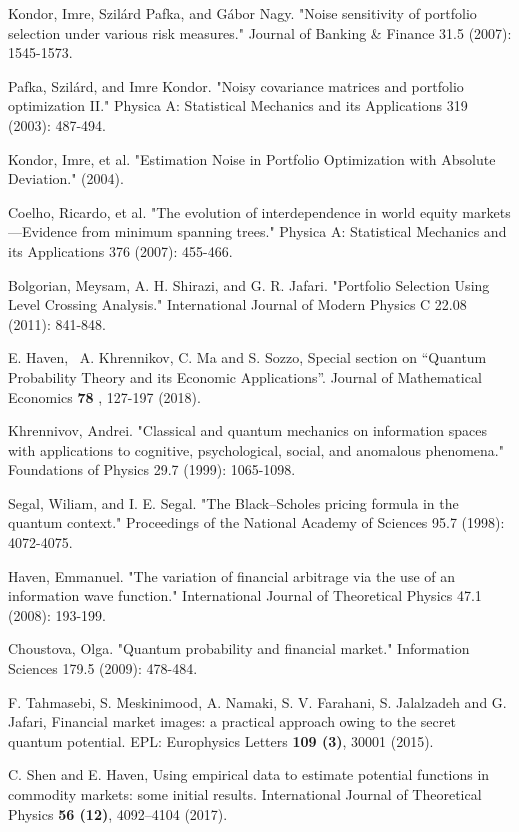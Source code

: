 \documentclass[ aip,jmp,reprint]{revtex4-2}
\begin{document}
\begin{thebibliography}{99}
 Kondor, Imre, Szilárd Pafka, and Gábor Nagy. "Noise sensitivity of portfolio selection under various risk measures." Journal of Banking \& Finance 31.5 (2007): 1545-1573.

  Pafka, Szilárd, and Imre Kondor. "Noisy covariance matrices and portfolio optimization II." Physica A: Statistical Mechanics and its Applications 319 (2003): 487-494.

 Kondor, Imre, et al. "Estimation Noise in Portfolio Optimization with Absolute Deviation." (2004).

 Coelho, Ricardo, et al. "The evolution of interdependence in world equity markets—Evidence from minimum spanning trees." Physica A: Statistical Mechanics and its Applications 376 (2007): 455-466.

 Bolgorian, Meysam, A. H. Shirazi, and G. R. Jafari. "Portfolio Selection Using Level Crossing Analysis." International Journal of Modern Physics C 22.08 (2011): 841-848.


 E. Haven, \ A. Khrennikov, C. Ma and S. Sozzo, Special
section  on \textquotedblleft Quantum Probability Theory and its Economic 
Applications\textquotedblright. Journal of Mathematical Economics \textbf{78}%
,  127-197 (2018).

 Khrennivov, Andrei. "Classical and quantum mechanics on information spaces with applications to cognitive, psychological, social, and anomalous phenomena." Foundations of Physics 29.7 (1999): 1065-1098.

 Segal, Wiliam, and I. E. Segal. "The Black–Scholes pricing formula in the quantum context." Proceedings of the National Academy of Sciences 95.7 (1998): 4072-4075.

 Haven, Emmanuel. "The variation of financial arbitrage via the use of an information wave function." International Journal of Theoretical Physics 47.1 (2008): 193-199.

 Choustova, Olga. "Quantum probability and financial market." Information Sciences 179.5 (2009): 478-484.

 F. Tahmasebi, S. Meskinimood, A. Namaki, S. V. Farahani,
S. Jalalzadeh and G. Jafari, Financial market images: a practical approach 
owing to the secret quantum potential. EPL: Europhysics Letters \textbf{109
	(3)}, 30001 (2015).

 C. Shen and E. Haven, Using empirical data to estimate 
potential functions in commodity markets: some initial results.
International  Journal of Theoretical Physics \textbf{56 (12)}, 4092--4104
(2017).


\end{thebibliography}
\end{document}
